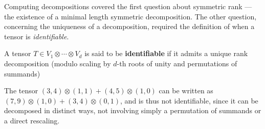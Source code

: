 \documentclass[../Lael_John_MasterThesis_Draft.tex]{subfiles}
\begin{document}


Computing decompositions covered the first question about symmetric rank --- the existence of a minimal length symmetric decomposition. The other question, concerning the uniqueness of a decomposition,  required the definition of when a tensor is \textit{identifiable}. 

\begin{definition}[Identifiability]\label{defn:identifiability}
    A tensor $T \in V_1 \otimes \cdots \otimes V_d$ is said to be \textbf{identifiable} if it admits a unique rank decomposition (modulo scaling by $d$-th roots of unity and permutations of summands)
\end{definition}
\begin{example}
	The tensor $(3 , 4)\otimes (1, 1) + (4, 5) \otimes (1, 0)$ can be written as $(7, 9)\otimes (1, 0) + (3, 4) \otimes (0, 1)$, and is thus not identifiable, since it can be decomposed in distinct ways, not involving simply a permutation of summands or a direct rescaling.
\end{example}
\end{document}
